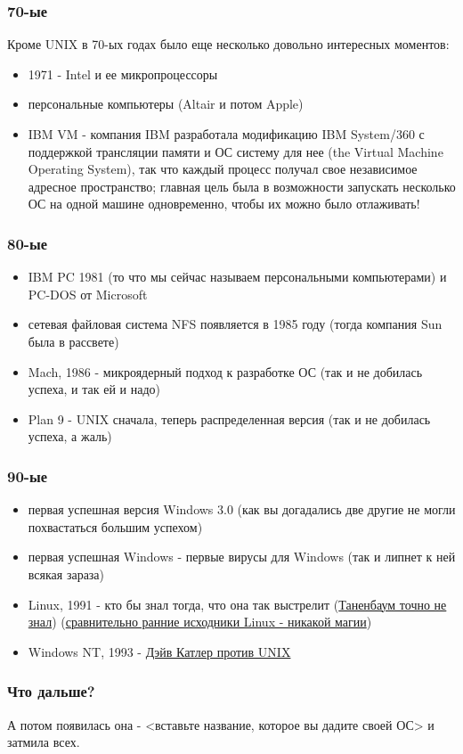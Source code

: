 \begin{frame}
\frametitle{70-ые}

Кроме UNIX в 70-ых годах было еще несколько довольно интересных моментов:

\begin{itemize}
  \item 1971 - Intel и ее микропроцессоры
  \item персональные компьютеры (Altair и потом Apple)
  \item IBM VM - компания IBM разработала модификацию IBM System/360 с
        поддержкой трансляции памяти и ОС систему для нее (the Virtual Machine
        Operating System), так что каждый процесс получал свое независимое
        адресное пространство; главная цель была в возможности запускать
        несколько ОС на одной машине одновременно, чтобы их можно было
        отлаживать!
\end{itemize}
\end{frame}

\begin{frame}
\frametitle{80-ые}

\begin{itemize}
  \item IBM PC 1981 (то что мы сейчас называем персональными компьютерами) и
        PC-DOS от Microsoft
  \item сетевая файловая система NFS появляется в 1985 году (тогда компания Sun
        была в рассвете)
  \item Mach, 1986 - микроядерный подход к разработке ОС (так и не добилась
        успеха, и так ей и надо)
  \item Plan 9 - UNIX сначала, теперь распределенная версия (так и не добилась
        успеха, а жаль)
\end{itemize}
\end{frame}

\begin{frame}
\frametitle{90-ые}

\begin{itemize}
  \item первая успешная версия Windows 3.0 (как вы догадались две другие
        не могли похвастаться большим успехом)
  \item первая успешная Windows - первые вирусы для Windows (так и липнет к ней
        всякая зараза)
  \item Linux, 1991 - кто бы знал тогда, что она так выстрелит
        (\href{https://en.wikipedia.org/wiki/Tanenbaum\%E2\%80\%93Torvalds_debate}{Таненбаум точно не знал})
        (\href{https://www.kernel.org/pub/linux/kernel/Historic/v0.99/}{сравнительно ранние исходники Linux - никакой магии})
  \item Windows NT, 1993 - \href{https://en.wikipedia.org/wiki/Dave_Cutler\#Attitude_towards_Unix}{Дэйв Катлер против UNIX}
\end{itemize}
\end{frame}

\begin{frame}
\frametitle{Что дальше?}
А потом появилась она - <вставьте название, которое вы дадите своей ОС> и
затмила всех.
\end{frame}
